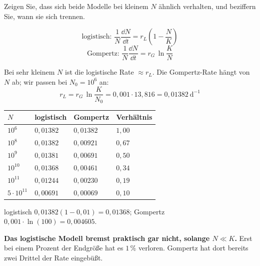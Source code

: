\begin{aufgabe}
Zeigen Sie, dass sich beide Modelle bei kleinem $N$ ähnlich verhalten, und beziffern Sie, wann sie sich trennen.

\loesung
{}
\[ \text{logistisch: } \frac{1}{N}\frac{\dd N}{\dd t} = r_L\left(1-\frac{N}{K}\right) \]
\[ \text{Gompertz: } \frac{1}{N}\frac{\dd N}{\dd t} = r_G\,\ln\frac{K}{N} \]

Bei sehr kleinem $N$ ist die logistische Rate $\approx r_L$. Die Gompertz-Rate hängt von $N$ ab; wir passen bei $N_0 = 10^{6}$ an:
\[ r_L = r_G\,\ln\frac{K}{N_0} = 0{,}001 \cdot 13{,}816 = 0{,}01382\ \mathrm{d}^{-1} \]

\begin{center}
{\small
\renewcommand{\arraystretch}{1.46}
\begin{tabular}{@{}P{1.8cm}P{2.2cm}P{2.2cm}P{1.8cm}@{}}
\toprule
$N$ & \textbf{logistisch} & \textbf{Gompertz} & \textbf{Verhältnis}\\
\midrule
$10^{6}$ & $0{,}01382$ & $0{,}01382$ & $1{,}00$\\
$10^{8}$ & $0{,}01382$ & $0{,}00921$ & $0{,}67$\\
$10^{9}$ & $0{,}01381$ & $0{,}00691$ & $0{,}50$\\
$10^{10}$ & $0{,}01368$ & $0{,}00461$ & $0{,}34$\\
$10^{11}$ & $0{,}01244$ & $0{,}00230$ & $0{,}19$\\
$5\cdot10^{11}$ & $0{,}00691$ & $0{,}00069$ & $0{,}10$\\
\bottomrule
\end{tabular}}
\end{center}

 logistisch $0{,}01382(1-0{,}01) = 0{,}01368$; Gompertz $0{,}001\cdot\ln(100) = 0{,}004605$.

\begin{center}
\begin{minipage}{0.9\textwidth}
\textbf{Das logistische Modell bremst praktisch gar nicht, solange $N \ll K$.} Erst bei einem Prozent der Endgröße hat es $1\,\%$ verloren. Gompertz hat dort bereits zwei Drittel der Rate eingebüßt.
\end{minipage}
\end{center}


\end{aufgabe}
